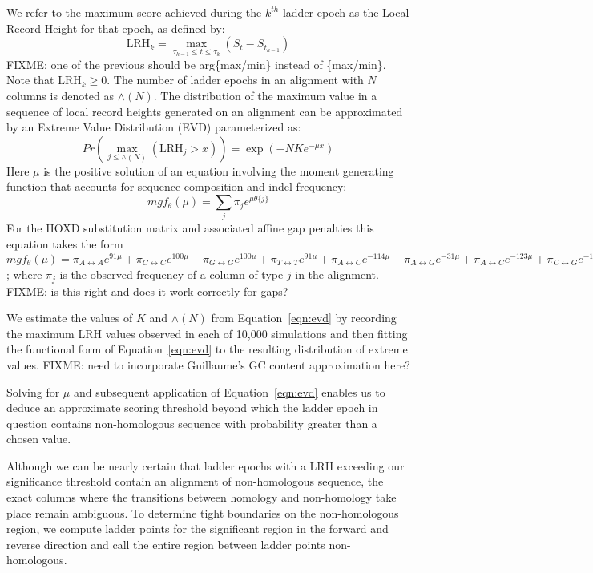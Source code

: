 \documentclass[twoside,11pt]{article}
\begin{document}
We refer to the maximum score achieved during the $k^{th}$ ladder epoch as the Local Record Height for that epoch, as defined by:
\begin{equation}
\mathrm{LRH}_k = \max_{\tau_{k-1}\leq t \leq \tau_k}(S_t - S_{t_{k-1}})
\end{equation}
FIXME: one of the previous should be arg\{max/min\} instead of \{max/min\}.  Note that $\mathrm{LRH}_k \geq 0$.  The number of ladder epochs in an alignment with $N$ columns is denoted as $\wedge(N)$.  The distribution of the maximum value in a sequence of local record heights generated on an alignment can be approximated by an Extreme Value Distribution (EVD) parameterized as:
\begin{equation}
\label{eqn:evd}
Pr(\max_{j \leq \wedge(N)}(\mathrm{LRH}_j > x)) = \exp(-NKe^{-\mu x})
\end{equation}
Here $\mu$ is the positive solution of an equation involving the moment generating function that accounts for sequence composition and indel frequency:
\begin{equation}
mgf_\theta(\mu) = \sum_j \pi_j e^{\mu \theta\{j\}}
\end{equation}
For the HOXD substitution matrix and associated affine gap penalties this equation takes the form $mgf_\theta(\mu) = \pi_{A\leftrightarrow A}e^{91\mu} + \pi_{C\leftrightarrow C}e^{100\mu} + \pi_{G\leftrightarrow G}e^{100\mu} + \pi_{T\leftrightarrow T}e^{91\mu} + \pi_{A\leftrightarrow C}e^{-114\mu} + \pi_{A\leftrightarrow G}e^{-31\mu} + \pi_{A\leftrightarrow C}e^{-123\mu} + \pi_{C\leftrightarrow G}e^{-125\mu} + \pi_{C\leftrightarrow T}e^{-31\mu} +  \pi_{G\leftrightarrow T}e^{-114\mu} + \pi_{gapopen}e^{-400\mu} + \pi_{gapext}e^{-35\mu}$; where $\pi_j$ is the observed frequency of a column of type $j$ in the alignment.  FIXME: is this right and does it work correctly for gaps?

We estimate the values of $K$ and $\wedge(N)$ from Equation~\ref{eqn:evd} by recording the maximum LRH values observed in each of 10,000 simulations and then fitting the functional form of Equation~\ref{eqn:evd} to the resulting distribution of extreme values.  FIXME: need to incorporate Guillaume's GC content approximation here?

Solving for $\mu$ and subsequent application of Equation~\ref{eqn:evd} enables us to deduce an approximate scoring threshold beyond which the ladder epoch in question contains non-homologous sequence with probability greater than a chosen value.

Although we can be nearly certain that ladder epochs with a LRH exceeding our significance threshold contain an alignment of non-homologous sequence, the exact columns where the transitions between homology and non-homology take place remain ambiguous.  To determine tight boundaries on the non-homologous region, we compute ladder points for the significant region in the forward and reverse direction and call the entire region between ladder points non-homologous.
\end{document}
